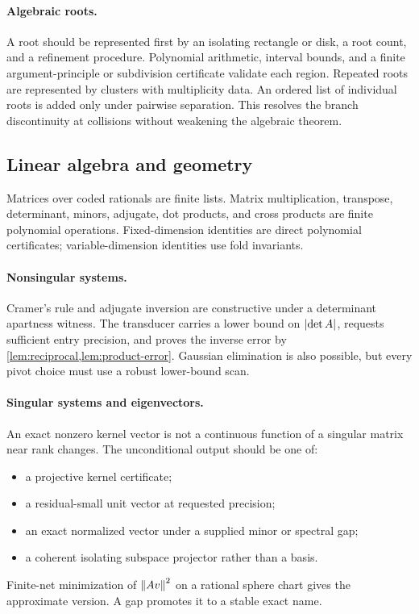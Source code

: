 \paragraph{Algebraic roots.}
A root should be represented first by an isolating rectangle or disk, a root
count, and a refinement procedure.  Polynomial arithmetic, interval bounds,
and a finite argument-principle or subdivision certificate validate each
region.  Repeated roots are represented by clusters with multiplicity data.
An ordered list of individual roots is added only under pairwise separation.
This resolves the branch discontinuity at collisions without weakening the
algebraic theorem.

\subsection{Linear algebra and geometry}

Matrices over coded rationals are finite lists.  Matrix multiplication,
transpose, determinant, minors, adjugate, dot products, and cross products are
finite polynomial operations.  Fixed-dimension identities are direct
polynomial certificates; variable-dimension identities use fold invariants.

\paragraph{Nonsingular systems.}
Cramer's rule and adjugate inversion are constructive under a determinant
apartness witness.  The transducer carries a lower bound on
\(\left|\det A\right|\), requests sufficient entry precision, and proves the inverse
error by \cref{lem:reciprocal,lem:product-error}.  Gaussian elimination is
also possible, but every pivot choice must use a robust lower-bound scan.

\paragraph{Singular systems and eigenvectors.}
An exact nonzero kernel vector is not a continuous function of a singular
matrix near rank changes.  The unconditional output should be one of:
\begin{itemize}
\item a projective kernel certificate;
\item a residual-small unit vector at requested precision;
\item an exact normalized vector under a supplied minor or spectral gap;
\item a coherent isolating subspace projector rather than a basis.
\end{itemize}
Finite-net minimization of \(\left\lVert Av\right\rVert^2\) on a rational sphere chart gives
the approximate version.  A gap promotes it to a stable exact name.


